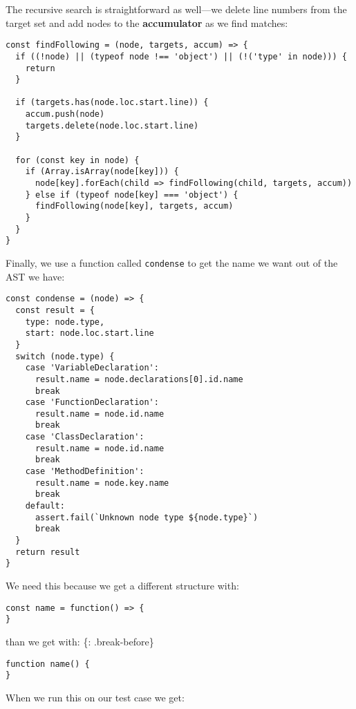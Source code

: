 \documentclass[krantzl]{krantz}
\newcommand{\glossref}[1]{\textbf{#1}}
\begin{document}
The recursive search is straightforward as well---we delete line numbers from the target set
and add nodes to the \glossref{accumulator} as we find matches:


\begin{lstlisting}[frame=single,frameround=tttt]
const findFollowing = (node, targets, accum) => {
  if ((!node) || (typeof node !== 'object') || (!('type' in node))) {
    return
  }

  if (targets.has(node.loc.start.line)) {
    accum.push(node)
    targets.delete(node.loc.start.line)
  }

  for (const key in node) {
    if (Array.isArray(node[key])) {
      node[key].forEach(child => findFollowing(child, targets, accum))
    } else if (typeof node[key] === 'object') {
      findFollowing(node[key], targets, accum)
    }
  }
}
\end{lstlisting}



Finally,
we use a function called \texttt{condense} to get the name we want out of the AST we have:


\begin{lstlisting}[frame=single,frameround=tttt]
const condense = (node) => {
  const result = {
    type: node.type,
    start: node.loc.start.line
  }
  switch (node.type) {
    case 'VariableDeclaration':
      result.name = node.declarations[0].id.name
      break
    case 'FunctionDeclaration':
      result.name = node.id.name
      break
    case 'ClassDeclaration':
      result.name = node.id.name
      break
    case 'MethodDefinition':
      result.name = node.key.name
      break
    default:
      assert.fail(`Unknown node type ${node.type}`)
      break
  }
  return result
}
\end{lstlisting}



\noindent We need this because we get a different structure with:

\begin{lstlisting}[frame=single,frameround=tttt]
const name = function() => {
}
\end{lstlisting}


\noindent than we get with:
\{: .break-before\}

\begin{lstlisting}[frame=single,frameround=tttt]
function name() {
}
\end{lstlisting}


When we run this on our test case we get:
\end{document}
